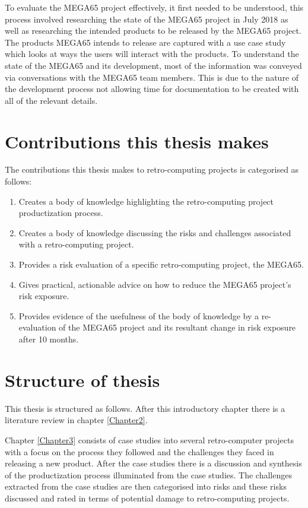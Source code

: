 To evaluate the MEGA65 project effectively, it first needed to be understood, this process involved researching the state of the MEGA65 project in July 2018 as well as researching the intended products to be released by the MEGA65 project. The products MEGA65 intends to release are captured with a use case study which looks at ways the users will interact with the products. To understand the state of the MEGA65 and its development, most of the information was conveyed via conversations with the MEGA65 team members. This is due to the nature of the development process not allowing time for documentation to be created with all of the relevant details. 

\section{Contributions this thesis makes}
The contributions this thesis makes to retro-computing projects is categorised as follows:
\begin{enumerate}
\item Creates a body of knowledge highlighting the retro-computing project productization process.
\item Creates a body of knowledge discussing the risks and challenges associated with a retro-computing project.
\item Provides a risk evaluation of a specific retro-computing project, the MEGA65.
\item Gives practical, actionable advice on how to reduce the MEGA65 project's risk exposure.
\item Provides evidence of the usefulness of the body of knowledge by a re-evaluation of the MEGA65 project and its resultant change in risk exposure after 10 months.
\end{enumerate}

\section{Structure of thesis}
This thesis is structured as follows. After this introductory chapter there is a literature review in chapter \ref{Chapter2}. 

Chapter \ref{Chapter3} consists of case studies into several retro-computer projects with a focus on the process they followed and the challenges they faced in releasing a new product. After the case studies there is a discussion and synthesis of the productization process illuminated from the case studies. The challenges extracted from the case studies are then categorised into risks and these risks discussed and rated in terms of potential damage to retro-computing projects. 

